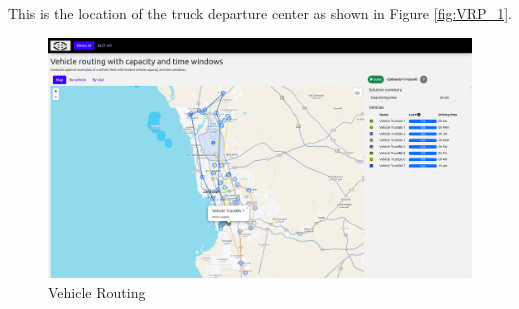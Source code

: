 \documentclass[a4paper,12pt, final]{article}
\begin{document}
This is the location of the truck departure center as shown in Figure \ref{fig:VRP_1}.
\newpage
\begin{figure}[htbp]
    \centering
    \includegraphics[width=\textwidth]{gfx/VRP_2.png}
    \caption{Vehicle Routing}
    \label{fig:VRP_2}
\end{figure}
\end{document}
